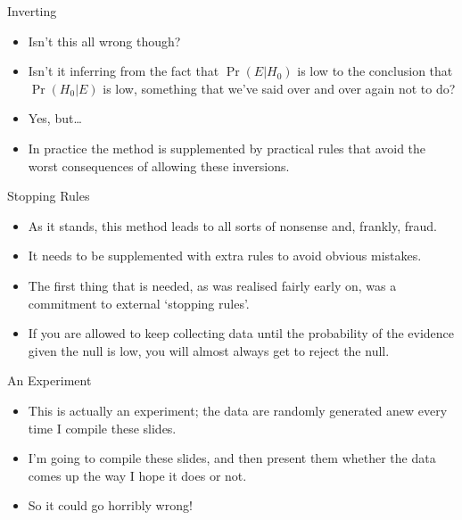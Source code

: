 \documentclass[
  ignorenonframetext,
]{beamer}
\providecommand{\tightlist}{%
  \setlength{\itemsep}{0pt}\setlength{\parskip}{0pt}}
\renewcommand{\,}{\text{, }}
\begin{document}
\begin{frame}{Inverting}
\protect\hypertarget{inverting}{}

\begin{itemize}
\tightlist
\item
  Isn't this all wrong though?
\item
  Isn't it inferring from the fact that \(\Pr(E | H_0)\) is low to the
  conclusion that \(\Pr(H_0 | E)\) is low, something that we've said
  over and over again not to do? \pause
\item
  Yes, but\ldots{} \pause
\item
  In practice the method is supplemented by practical rules that avoid
  the worst consequences of allowing these inversions.
\end{itemize}

\end{frame}

\begin{frame}{Stopping Rules}
\protect\hypertarget{stopping-rules}{}

\begin{itemize}
\tightlist
\item
  As it stands, this method leads to all sorts of nonsense and, frankly,
  fraud.
\item
  It needs to be supplemented with extra rules to avoid obvious
  mistakes.
\item
  The first thing that is needed, as was realised fairly early on, was a
  commitment to external `stopping rules'.
\item
  If you are allowed to keep collecting data until the probability of
  the evidence given the null is low, you will almost always get to
  reject the null.
\end{itemize}

\end{frame}

\begin{frame}{An Experiment}
\protect\hypertarget{an-experiment}{}

\begin{itemize}
\tightlist
\item
  This is actually an experiment; the data are randomly generated anew
  every time I compile these slides.
\item
  I'm going to compile these slides, and then present them whether the
  data comes up the way I hope it does or not.
\item
  So it could go horribly wrong!
\end{itemize}

\end{frame}
\end{document}
